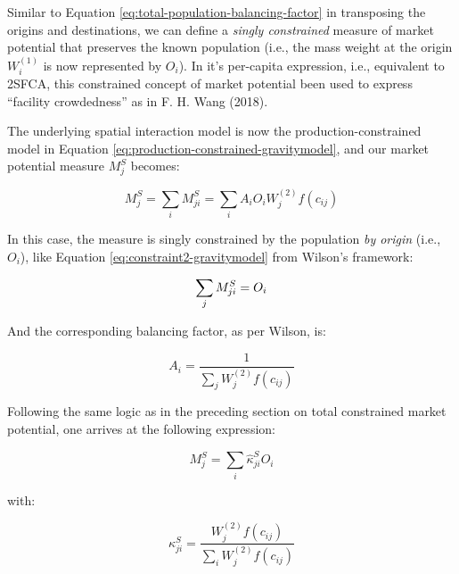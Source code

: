 \documentclass[
11pt, %
oneside, %
english, %
singlespacing, %
]{macthesis} %
\begin{document}
Similar to Equation \ref{eq:total-population-balancing-factor} in transposing the origins and destinations, we can define a \emph{singly constrained} measure of market potential that preserves the known population (i.e., the mass weight at the origin \(W_i^{(1)}\) is now represented by \(O_i\)). In it's per-capita expression, i.e., equivalent to 2SFCA, this constrained concept of market potential been used to express ``facility crowdedness'' as in F. H. Wang (2018).

The underlying spatial interaction model is now the production-constrained model in Equation \ref{eq:production-constrained-gravitymodel}, and our market potential measure \(M^S_j\) becomes:

\begin{equation}
\label{eq:population-constrained-accessibility}
M^S_j =  \sum_i M^S_{ji} = \sum_i A_i O_i W_j^{(2)} f(c_{ij})
\end{equation} 

In this case, the measure is singly constrained by the population \emph{by origin} (i.e., \(O_i\)), like Equation \ref{eq:constraint2-gravitymodel} from Wilson's framework:

\begin{equation}
\label{eq:population-constraint}
\sum_j M^S_{ji} =  O_i \\
\end{equation} 

And the corresponding balancing factor, as per Wilson, is:

\begin{equation}
\label{eq:population-constrained-proportionality-constants}
A_i = \frac{1}{\sum_j W_j^{(2)} f(c_{ij})}
\end{equation} 

Following the same logic as in the preceding section on total constrained market potential, one arrives at the following expression:

\begin{equation}
\label{eq:production-constrained-accessibility-with-proportional-allocation-factor}
M^S_{j} = \sum_i \hat \kappa^S_{ji} O_i
\end{equation} 

\noindent with:

\begin{equation}
\label{eq:attraction-constrained-proportional-allocation-factor}
\kappa^S_{ji} = \frac{W_j^{(2)} f(c_{ij})}{\sum_i W_j^{(2)} f(c_{ij})}
\end{equation} 
\end{document}
